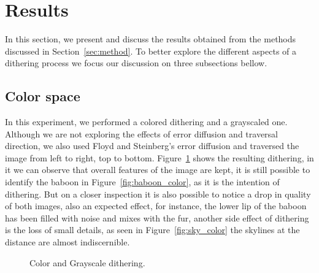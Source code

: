 \documentclass[conference]{IEEEtran}
\begin{document}
\section{Results}
\label{sec:results}
In this section, we present and discuss the results obtained from the methods discussed in Section~\ref{sec:method}. To better explore the different aspects of a dithering process we focus our discussion on three subsections bellow.
\subsection{Color space}
In this experiment, we performed a colored dithering and a grayscaled one. Although we are not exploring the effects of error diffusion and traversal direction, we also used Floyd and Steinberg's error diffusion and traversed the image from left to right, top to bottom. Figure~\ref{fig:baboon_colorspace} shows the resulting dithering, in it we can observe that overall features of the image are kept, it is still possible to identify the baboon in Figure~\ref{fig:baboon_color}, as it is the intention of dithering. But on a closer inspection it is also possible to notice a drop in quality of both images, also an expected effect, for instance, the lower lip of the baboon has been filled with noise and mixes with the fur, another side effect of dithering is the loss of small details, as seen in Figure~\ref{fig:sky_color} the skylines at the distance are almost indiscernible.
\begin{figure}[htbp]
	\centering
	\quad
	\caption{Color and Grayscale dithering.}
	\label{fig:baboon_colorspace}
\end{figure}
\end{document}
